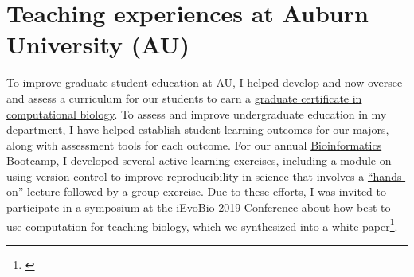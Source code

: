 
\section*{Teaching experiences at Auburn University (AU)}
To improve graduate student education at AU,
I helped develop and now oversee and assess a curriculum for our students to
earn a
\href{http://bulletin.auburn.edu/thegraduateschool/graduatedegreesoffered/biologicalsciencesmsphd_major/computationalbiology_gradcert/}{graduate certificate in computational biology}.
To assess and improve undergraduate education in my department, I have helped
establish student learning outcomes for our majors, along with assessment tools
for each outcome.
For our annual
\href{http://www.auburn.edu/cosam/bioinformatics/}{Bioinformatics Bootcamp},
I developed several active-learning exercises,
including a module on using version control to improve reproducibility in
science that involves a
\href{http://phyletica.org/slides/git-intro/}{``hands-on'' lecture}
followed by a
\href{https://github.com/joaks1/au-bootcamp-git-intro}{group exercise}.
Due to these efforts, I was invited to participate in a symposium at the
iEvoBio 2019 Conference about how best to use computation for teaching biology,
which we synthesized into a
white paper\footnote{\label{ievobiopaper}}.

